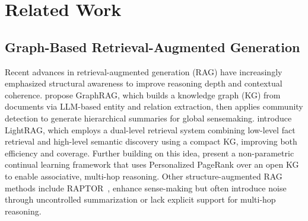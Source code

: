 
\section{Related Work}
\label{sec:related_work}

\subsection{Graph-Based Retrieval-Augmented Generation}

Recent advances in retrieval-augmented generation (RAG) have increasingly emphasized structural awareness to improve reasoning depth and contextual coherence. 
\citet{edge2024local} propose GraphRAG, which builds a knowledge graph (KG) from documents via LLM-based entity and relation extraction, then applies community detection to generate hierarchical summaries for global sensemaking. 
\citet{guo2024lightrag} introduce LightRAG, which employs a dual-level retrieval system combining low-level fact retrieval and high-level semantic discovery using a compact KG, improving both efficiency and coverage. 
Further building on this idea, \citet{hipporag, gutiérrez2025HippoRAG2} present a non-parametric continual learning framework that uses Personalized PageRank over an open KG to enable associative, multi-hop reasoning. 
Other structure-augmented RAG methods include RAPTOR~\citep{raptor}, \citet{chen2023walkingmemorymazecontext} enhance sense-making but often introduce noise through uncontrolled summarization or lack explicit support for multi-hop reasoning.
